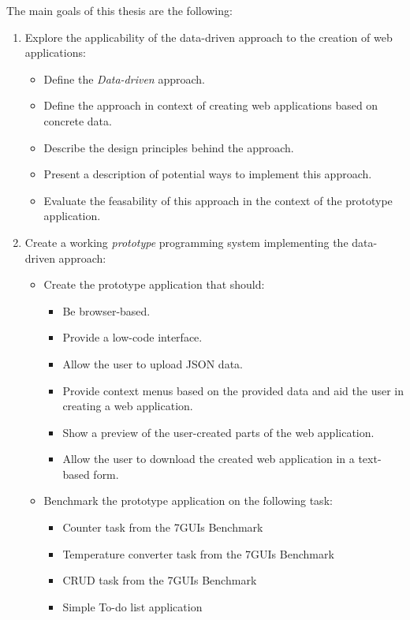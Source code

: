 The main goals of this thesis are the following:
\begin{enumerate}
	\item Explore the applicability of the data-driven approach to the creation of web applications:
	      \begin{itemize}
		      \item Define the \emph{Data-driven} approach.
		      \item Define the approach in context of creating web applications based on concrete data.
		      \item Describe the design principles behind the approach.
		      \item Present a description of potential ways to implement this approach.
		      \item Evaluate the feasability of this approach in the context of the prototype application.
	      \end{itemize}
	\item Create a working \emph{prototype} programming system implementing the data-driven approach:
	      \begin{itemize}
		      \item Create the prototype application that should:
		            \begin{itemize}
			            \item Be browser-based.
			            \item Provide a low-code interface.
			            \item Allow the user to upload JSON data.
			            \item Provide context menus based on the provided data and aid the user in creating a web application.
			            \item Show a preview of the user-created parts of the web application.
			            \item Allow the user to download the created web application in a text-based form.
		            \end{itemize}

		      \item Benchmark the prototype application on the following task:
		            \begin{itemize}
			            \item Counter task from the 7GUIs Benchmark
			            \item Temperature converter task from the 7GUIs Benchmark
			            \item CRUD task from the 7GUIs Benchmark
			            \item Simple To-do list application
		            \end{itemize}

	      \end{itemize}
\end{enumerate}

